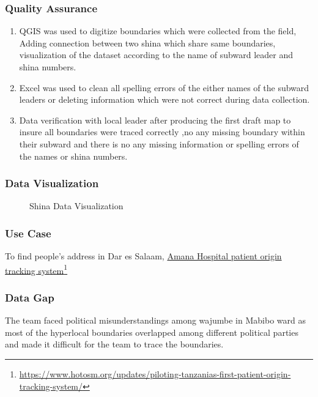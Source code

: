 \documentclass[a4paper,12pt,twoside]{article}
\begin{document}
\subsubsection{Quality Assurance}
\begin{enumerate}
    \item QGIS was used to digitize boundaries which were collected from the field, Adding connection between two shina which share same boundaries, visualization of the dataset according to the name of subward leader and shina numbers. 
    \item Excel was used to clean all spelling errors of the either names of the subward leaders or deleting information which were not correct during data collection. 
    \item Data verification with local leader after producing the first draft map  to insure all boundaries were traced correctly ,no any missing boundary within their subward and  there is no any missing information or spelling errors of the names or shina numbers. 

\end{enumerate}

\subsubsection{Data Visualization}
\begin{figure}[h]
  \color{RHgreen}\caption{Shina Data Visualization}
  \centering
\end{figure}

\subsubsection{Use Case}
To find people’s address in Dar es Salaam, \href{https://www.hotosm.org/updates/piloting-tanzanias-first-patient-origin-tracking-system/}{Amana Hospital patient origin tracking system}\footnote{\url{https://www.hotosm.org/updates/piloting-tanzanias-first-patient-origin-tracking-system/}}

\subsubsection{Data Gap}
The team faced political misunderstandings among wajumbe in Mabibo ward as most of the hyperlocal boundaries overlapped among different political parties and made it difficult for the team to trace the boundaries.
\end{document}
